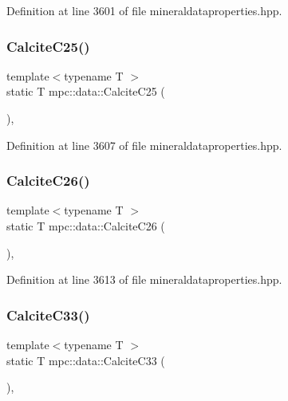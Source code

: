 Definition at line 3601 of file mineraldataproperties.\+hpp.

\mbox{\label{namespacempc_1_1data_ada42e7ec70af036bc9d942dd517223df}} 
\subsubsection{\texorpdfstring{Calcite\+C25()}{CalciteC25()}}
{\footnotesize\ttfamily template$<$typename T $>$ \\
static T mpc\+::data\+::\+Calcite\+C25 (\begin{DoxyParamCaption}{ }\end{DoxyParamCaption})\hspace{0.3cm}{\ttfamily [inline]}, {\ttfamily [static]}}



Definition at line 3607 of file mineraldataproperties.\+hpp.

\mbox{\label{namespacempc_1_1data_aa2b680629c194da9673465454808e9cb}} 
\subsubsection{\texorpdfstring{Calcite\+C26()}{CalciteC26()}}
{\footnotesize\ttfamily template$<$typename T $>$ \\
static T mpc\+::data\+::\+Calcite\+C26 (\begin{DoxyParamCaption}{ }\end{DoxyParamCaption})\hspace{0.3cm}{\ttfamily [inline]}, {\ttfamily [static]}}



Definition at line 3613 of file mineraldataproperties.\+hpp.

\mbox{\label{namespacempc_1_1data_a83bb9a48779b21f4d063928cc218fce6}} 
\subsubsection{\texorpdfstring{Calcite\+C33()}{CalciteC33()}}
{\footnotesize\ttfamily template$<$typename T $>$ \\
static T mpc\+::data\+::\+Calcite\+C33 (\begin{DoxyParamCaption}{ }\end{DoxyParamCaption})\hspace{0.3cm}{\ttfamily [inline]}, {\ttfamily [static]}}



